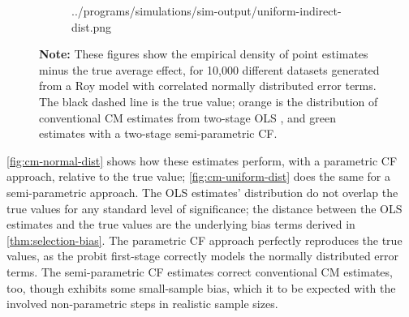 \begin{figure}[h!]
\begin{subfigure}[c]{0.475\textwidth}
{            ../programs/simulations/sim-output/uniform-indirect-dist.png}
    \end{subfigure}
    \label{fig:cm-uniform-dist}
    \justify
    \footnotesize    
    \textbf{Note:}
    These figures show the empirical density of point estimates minus the true average effect, for 10,000 different datasets generated from a Roy model with correlated normally distributed error terms.
    The black dashed line is the true value;
    orange is the distribution of conventional CM estimates from two-stage OLS \citep{imai2010identification},
    and green estimates with a two-stage semi-parametric CF.
\end{figure}

\autoref{fig:cm-normal-dist} shows how these estimates perform, with a parametric CF approach, relative to the true value; \autoref{fig:cm-uniform-dist} does the same for a semi-parametric approach.
The OLS estimates' distribution do not overlap the true values for any standard level of significance; the distance between the OLS estimates and the true values are the underlying bias terms derived in \autoref{thm:selection-bias}.
The parametric CF approach perfectly reproduces the true values, as the probit first-stage correctly models the normally distributed error terms.
The semi-parametric CF estimates correct conventional CM estimates, too, though exhibits some small-sample bias, which it to be expected with the involved non-parametric steps in realistic sample sizes.

